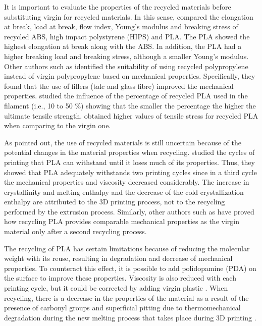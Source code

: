 \documentclass[]{interact}
\theoremstyle{plain}%
\theoremstyle{definition}
\theoremstyle{remark}
\begin{document}
It is important to evaluate the properties of the recycled materials
before substituting virgin for recycled materials. In this sense,
\citet{Kumar2018b} compared the elongation at break, load at break, flow
index, Young's modulus and breaking stress of recycled ABS, high impact
polystyrene (HIPS) and PLA. The PLA showed the highest elongation at
break along with the ABS. In addition, the PLA had a higher breaking
load and breaking stress, although a smaller Young's modulus. Other
authors such as \citet{Gu2016} identified the suitability of using
recycled polypropylene instead of virgin polypropylene based on
mechanical properties. Specifically, they found that the use of fillers
(talc and glass fibre) improved the mechanical properties.
\citet{Babagowda2018} studied the influence of the percentage of
recycled PLA used in the filament (i.e., 10 to 50 \%) showing that the
smaller the percentage the higher the ultimate tensile strength.
\citet{Pinho2020} obtained higher values of tensile stress for recycled
PLA when comparing to the virgin one.

As \citet{Suarez2020} pointed out, the use of recycled materials is
still uncertain because of the potential changes in the material
properties when recycling. \citet{Zhao2018} studied the cycles of
printing that PLA can withstand until it loses much of its properties.
Thus, they showed that PLA adequately withstands two printing cycles
since in a third cycle the mechanical properties and viscosity decreased
considerably. The increase in crystallinity and melting enthalpy and the
decrease of the cold crystallization enthalpy are attributed to the 3D
printing process, not to the recycling performed by the extrusion
process. Similarly, other authors such as \citet{Lanzotti2019} have
proved how recycling PLA provides comparable mechanical properties as
the virgin material only after a second recycling process.

The recycling of PLA has certain limitations because of reducing the
molecular weight with its reuse, resulting in degradation and decrease
of mechanical properties. To counteract this effect, it is possible to
add polidopamine (PDA) on the surface to improve these properties.
Viscosity is also reduced with each printing cycle, but it could be
corrected by adding virgin plastic \citep{Zhao2018, Zhao2018a}. When
recycling, there is a decrease in the properties of the material as a
result of the presence of carbonyl groups and superficial pitting due to
thermomechanical degradation during the new melting process that takes
place during 3D printing \citep{Zhao2018}.
\end{document}

